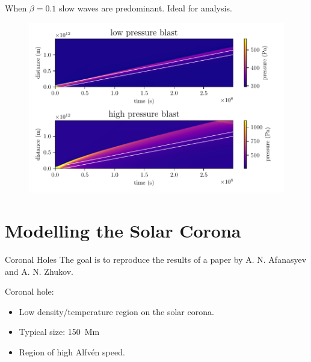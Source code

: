 \documentclass{beamer}
\begin{document}
\begin{frame}
	When $\beta = 0.1$ slow waves are predominant. Ideal for analysis. 
	\begin{figure}[h]
		\centering
		\includegraphics[width=\textwidth]{figures/slowwave_time.pdf}
	\end{figure}
\end{frame}
\section{Modelling the Solar Corona}
\begin{frame}{Coronal Holes}
	The goal is to reproduce the results of a paper by A. N. Afanasyev and A. N. Zhukov\cite{afanasyev2018propagation}.

   \bigskip 
   Coronal hole:
   \begin{itemize}
   	\item Low density/temperature region on the solar corona. 
	\item Typical size: \SI{150}{Mm}
	\item Region of high Alfv\'en speed. 
   \end{itemize}
   
\end{frame}
\end{document}
